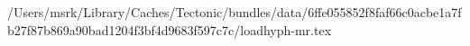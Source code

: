 /Users/msrk/Library/Caches/Tectonic/bundles/data/6ffe055852f8faf66c0acbe1a7fb27f87b869a90bad1204f3bf4d9683f597c7c/loadhyph-mr.tex